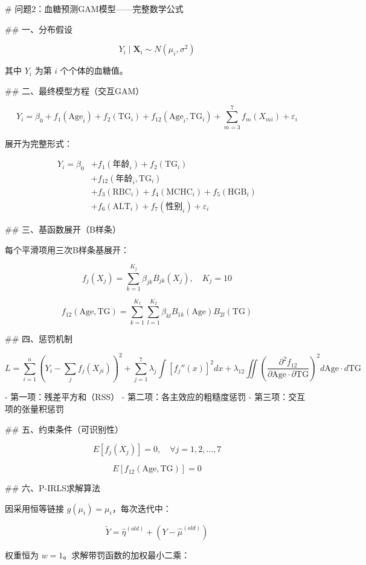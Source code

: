 # 问题2：血糖预测GAM模型——完整数学公式

## 一、分布假设

\[
Y_i \mid \boldsymbol{X}_i \sim N(\mu_i, \sigma^2)
\]

其中 \(Y_i\) 为第 \(i\) 个个体的血糖值。

## 二、最终模型方程（交互GAM）

\[
\boxed{Y_i = \beta_0 + f_1(\text{Age}_i) + f_2(\text{TG}_i) + f_{12}(\text{Age}_i, \text{TG}_i) + \sum_{m=3}^{7} f_m(X_{mi}) + \varepsilon_i}
\]

展开为完整形式：

\[
\begin{aligned}
Y_i = \beta_0 &+ f_1(\text{年龄}_i) + f_2(\text{TG}_i) \\
&+ f_{12}(\text{年龄}_i, \text{TG}_i) \\
&+ f_3(\text{RBC}_i) + f_4(\text{MCHC}_i) + f_5(\text{HGB}_i) \\
&+ f_6(\text{ALT}_i) + f_7(\text{性别}_i) + \varepsilon_i
\end{aligned}
\]

## 三、基函数展开（B样条）

每个平滑项用三次B样条基展开：

\[
f_j(X_j) = \sum_{k=1}^{K_j} \beta_{jk} B_{jk}(X_j), \quad K_j = 10
\]

\[
f_{12}(\text{Age}, \text{TG}) = \sum_{k=1}^{K_1}\sum_{l=1}^{K_2} \beta_{kl} B_{1k}(\text{Age}) B_{2l}(\text{TG})
\]

## 四、惩罚机制

\[
L = \sum_{i=1}^{n} \left(Y_i - \sum_{j} f_j(X_{ji})\right)^2 + \sum_{j=1}^{7} \lambda_j \int [f_j''(x)]^2 dx + \lambda_{12} \iint \left(\frac{\partial^2 f_{12}}{\partial \text{Age} \cdot \partial \text{TG}}\right)^2 d\text{Age} \cdot d\text{TG}
\]

- 第一项：残差平方和（RSS）
- 第二项：各主效应的粗糙度惩罚
- 第三项：交互项的张量积惩罚

## 五、约束条件（可识别性）

\[
E[f_j(X_j)] = 0, \quad \forall j = 1, 2, \ldots, 7
\]

\[
E[f_{12}(\text{Age}, \text{TG})] = 0
\]

## 六、P-IRLS求解算法

因采用恒等链接 \(g(\mu_i) = \mu_i\)，每次迭代中：

\[
\tilde{Y} = \hat{\eta}^{(old)} + (Y - \hat{\mu}^{(old)})
\]

权重恒为 \(w = 1\)。求解带罚函数的加权最小二乘：

